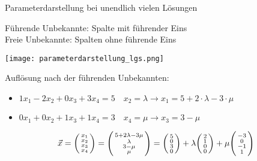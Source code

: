    \begin{KR}{Parameterdarstellung} bei unendlich vielen Lösungen

        \begin{minipage}{0.74\linewidth}
            Führende Unbekannte: Spalte mit führender Eins\\
            Freie Unbekannte: Spalten ohne führende Eins
        \end{minipage}
        \begin{minipage}{0.25\linewidth}
            \texttt{[image: parameterdarstellung\_lgs.png]}
        \end{minipage}

        \vspace{1mm}
        
        Auflösung nach der führenden Unbekannten:
        \begin{itemize}
            \item $1 x_1 - 2 x_2 + 0 x_3 + 3 x_4 = 5 \quad x_2 = \lambda \rightarrow x_1 = 5 + 2 \cdot \lambda - 3 \cdot \mu$
            \item $0 x_1 + 0 x_2 + 1 x_3 + 1 x_4 = 3 \quad x_4 = \mu \rightarrow x_3 = 3 - \mu$    
        \end{itemize}
        \vspace*{2mm}
        $$ \vec{x} = \begin{psmallmatrix} x_1 \\ x_2 \\ x_3 \\ x_4 \end{psmallmatrix} 
        = \begin{psmallmatrix} 5 + 2 \lambda - 3 \mu \\ \lambda \\ 3 - \mu \\ \mu \end{psmallmatrix} 
        = \begin{psmallmatrix} 5 \\ 0 \\ 3 \\ 0 \end{psmallmatrix} + \lambda \begin{psmallmatrix} 2 \\ 1 \\ 0 \\ 0 \end{psmallmatrix} + \mu \begin{psmallmatrix} -3 \\ 0 \\ -1 \\ 1 \end{psmallmatrix}$$
    \end{KR}

